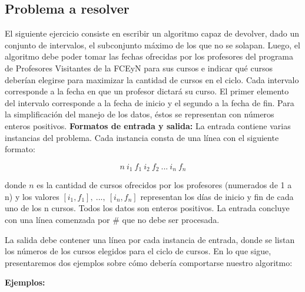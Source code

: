 \subsection{Problema a resolver}
El siguiente ejercicio consiste en escribir un algoritmo capaz de devolver, dado un conjunto de intervalos, el subconjunto máximo de los que no se solapan. Luego, el algoritmo debe poder tomar las fechas ofrecidas por los profesores del programa de Profesores Visitantes de la FCEyN para sus cursos e indicar qué cursos deberían elegirse para maximizar la cantidad de cursos en el ciclo. Cada intervalo corresponde a la fecha en que un profesor  dictará su curso. El primer elemento del intervalo corresponde a la fecha de inicio y el segundo a la fecha de fin. Para la simplificación del manejo de los datos, éstos se representan con números enteros positivos.\newline
\newline
\textbf {Formatos de entrada y salida:}\newline
\newline
La entrada contiene varias instancias del problema. Cada instancia consta de una línea con el siguiente formato:

$$n\ i_{1}\ f_{1}\ i_{2}\ f_{2}\ ...\ i_{n}\ f_{n}$$


donde \textbf{$n$} es la cantidad de cursos ofrecidos por los profesores (numerados de 1 a n) y los valores \textbf{$[i_{1},f_{1}],\ ...,\ [i_{n},f_{n}]$} representan los días de inicio y fin de cada uno de los n cursos. Todos los datos son enteros positivos. La entrada concluye con una línea comenzada por \# que no debe ser procesada.\newline

La salida debe contener una línea por cada instancia de entrada, donde se listan los números de los cursos elegidos para el ciclo de cursos.\newline
\newline
En lo que sigue, presentaremos dos ejemplos sobre cómo debería comportarse nuestro algoritmo:\newline

{\large{\textbf{Ejemplos:}}}\newline

